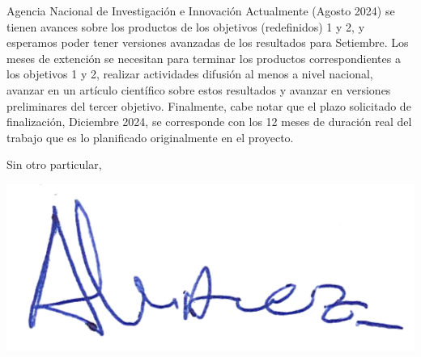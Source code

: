 \documentclass{letter}\usepackage[]{graphicx}\usepackage[]{xcolor}
\begin{document}
\begin{letter}{Agencia Nacional de Investigación e Innovación}
Actualmente (Agosto 2024) se tienen avances sobre los productos de los objetivos (redefinidos) 1 y 2, y esperamos poder tener versiones avanzadas de los resultados para Setiembre. Los meses de extención se necesitan para terminar los productos correspondientes a los objetivos 1 y 2, realizar actividades difusión al menos a nivel nacional, avanzar en un artículo científico sobre estos resultados y avanzar en versiones preliminares del tercer objetivo. Finalmente, cabe notar que el plazo solicitado de finalización, Diciembre 2024, se corresponde con los 12 meses de duración real del trabajo que es lo planificado originalmente en el proyecto. 


\closing{Sin otro particular,}
\begin{center}
\includegraphics[scale=.5]{../firma_nacho}
\end{center}

\end{letter}
\end{document}

